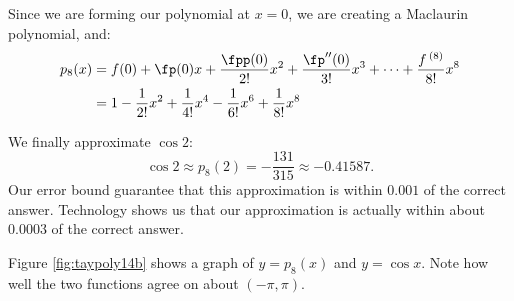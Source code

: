 {Since we are forming our polynomial at $x=0$, we are creating a Maclaurin polynomial, and:
\begin{align*}
p_8(x) &= f(0) + \fp(0)x + \frac{\fpp(0)}{2!}x^2 + \frac{\fp''(0)}{3!}x^3 + \cdots +\frac{f\,^{(8)}}{8!}x^8\\
		&=  1-\frac{1}{2!}x^2+\frac{1}{4!}x^4-\frac{1}{6!}x^6+\frac{1}{8!}x^8
\end{align*}

\enlargethispage{2\baselineskip}
We finally approximate $\cos 2$:
$$\cos 2 \approx p_8(2) = -\frac{131}{315} \approx -0.41587.$$ Our error bound guarantee that this approximation is within $0.001$ of the correct answer. Technology shows us that our approximation is actually within about $0.0003$ of the correct answer.

Figure \ref{fig:taypoly14b} shows a graph of $y=p_8(x)$ and $y=\cos x$. Note how well the two functions agree on about $(-\pi,\pi)$.
}\clearpage%


